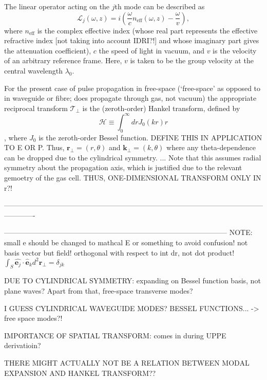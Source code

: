 \documentclass[a4paper]{jpconf}
\begin{document}
The linear operator acting on the $j$th mode can be described as 
\begin{equation}
\mathcal{L}_j(\omega, z) = i \left( \frac{\omega}{c} n_{\text{eff}}(\omega,z) - \frac{\omega}{v} \right),
\end{equation}
where $n_\text{eff}$ is the complex effective index (whose real part represents the effective refractive index [not taking into account IDRI?!] and whose imaginary part gives the attenuation coefficient), $c$ the speed of light in vacuum, and $v$ is the velocity of an arbitrary reference frame. Here, $v$ is taken to be the group velocity at the central wavelength $\lambda_0$. \par 
For the present case of pulse propagation in free-space (`free-space' as opposed to in waveguide or fibre; does propagate through gas, not vacuum) the appropriate reciprocal transform $\mathcal{T}_\perp$ is the (zeroth-order) Hankel transform, defined by
\begin{equation}
\mathcal{H} \equiv \int_0^\infty dr J_0 (kr)r
\end{equation},
where $J_0$ is the zeroth-order Bessel function. DEFINE THIS IN APPLICATION TO E OR P. Thus, $\mathbf{r}_\perp = (r, \theta)$ and $\mathbf{k}_\perp = (k, \theta)$ where any theta-dependence can be dropped due to the cylindrical symmetry. 
...
Note that this assumes radial symmetry about the propagation axis, which is justified due to the relevant gemoetry of the gas cell. THUS, ONE-DIMENSIONAL TRANSFORM ONLY IN r?!

-------------------------------------------------------------------------------------------------------------------------


---------------------------------------------------------------------------------------------
NOTE: small e should be changed to mathcal E or something to avoid confusion! not basis vector but field! orthogonal with respect to int dr, not dot product!
$\int_S \hat{\mathbf{e}_j} \cdot \hat{\mathbf{e}}_k d^2 \mathbf{r}_\perp = \delta_{jk}$

DUE TO CYLINDRICAL SYMMETRY: expanding on Bessel function basis, not plane waves? Apart from that, free-space transverse modes?

I GUESS CYLINDRICAL WAVEGUIDE MODES? BESSEL FUNCTIONS...
		-> free space modes?!
		
		IMPORTANCE OF SPATIAL TRANSFORM: comes in during UPPE derivatioin?

THERE MIGHT ACTUALLY NOT BE A RELATION BETWEEN MODAL EXPANSION AND HANKEL TRANSFORM??
\end{document}
